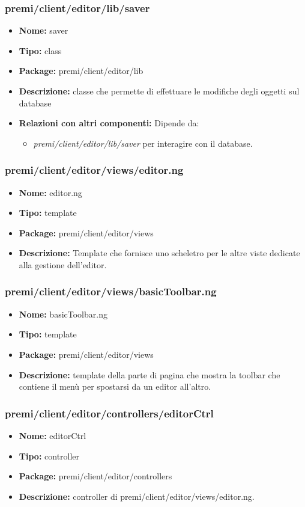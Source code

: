 \subsubsection{premi/client/editor/lib/saver}
\begin{itemize}
  \item[] \textbf{Nome:} saver
  \item[] \textbf{Tipo:} class
  \item[] \textbf{Package:} premi/client/editor/lib
  \item[] \textbf{Descrizione:} classe che permette di effettuare le modifiche degli oggetti sul database
  \item[] \textbf{Relazioni con altri componenti:} Dipende da:
\begin{itemize} 
	\item \textit{premi/client/editor/lib/saver} per interagire con il database.
\end{itemize}  
\end{itemize}
\subsubsection{premi/client/editor/views/editor.ng}
\begin{itemize}
  \item[] \textbf{Nome:} editor.ng
  \item[] \textbf{Tipo:} template
  \item[] \textbf{Package:} premi/client/editor/views
  \item[] \textbf{Descrizione:} Template che fornisce uno scheletro per le altre viste dedicate alla gestione dell'editor.
\end{itemize}
\subsubsection{premi/client/editor/views/basicToolbar.ng}
\begin{itemize}
  \item[] \textbf{Nome:} basicToolbar.ng
  \item[] \textbf{Tipo:} template
  \item[] \textbf{Package:} premi/client/editor/views
  \item[] \textbf{Descrizione:} template della parte di pagina che mostra la toolbar che contiene il menù per spostarsi da un editor all'altro.
\end{itemize}
\subsubsection{premi/client/editor/controllers/editorCtrl}
\begin{itemize}
  \item[] \textbf{Nome:} editorCtrl
  \item[] \textbf{Tipo:} controller
  \item[] \textbf{Package:} premi/client/editor/controllers
  \item[] \textbf{Descrizione:} controller di premi/client/editor/views/editor.ng.
\end{itemize}
